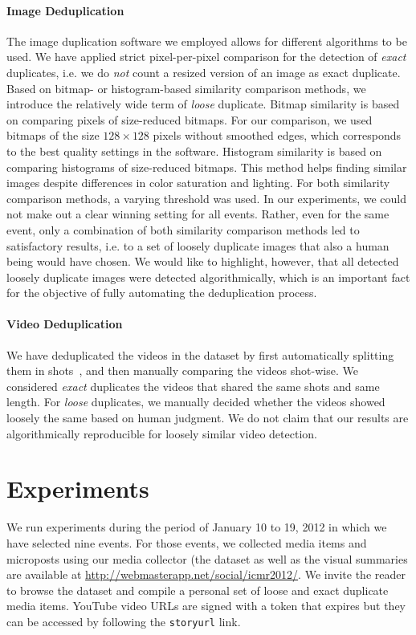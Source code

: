 \documentclass{acm_proc_article-sp}
\let\oldemph\emph
\renewcommand{\emph}[1]{\oldemph{\fontsize{9}{9}\selectfont #1}}
\newcommand{\inlinelistingsize}{\fontsize{8pt}{11pt}}
\let\oldurl\url
\renewcommand{\url}[1]{\inlinelistingsize\oldurl{#1}}
\begin{document}
\paragraph{Image Deduplication}
The image duplication software we employed allows for different algorithms to be used. We have applied strict pixel-per-pixel comparison for the detection of \emph{exact} duplicates, i.e. we do \emph{not} count a resized version of an image as exact duplicate. Based on bitmap- or histogram-based similarity comparison methods, we introduce the relatively wide term of \emph{loose} duplicate. Bitmap similarity is based on comparing pixels of size-reduced bitmaps.
For our comparison, we used bitmaps of the size $128 \times 128$ pixels without smoothed edges, which corresponds to the best quality settings in the software.
Histogram similarity is based on comparing histograms of size-reduced bitmaps. This method helps finding similar images despite differences in color saturation and lighting. For both similarity comparison methods, a varying threshold was used. In our experiments, we could not make out a clear winning setting for all events. Rather, even for the same event, only a combination of both similarity comparison methods led to satisfactory results, i.e. to a set of loosely duplicate images that also a human being would have chosen. We would like to highlight, however, that all detected loosely duplicate images were detected algorithmically, which is an important fact for the objective of fully automating the deduplication process.

\paragraph{Video Deduplication}
We have deduplicated the videos in the dataset by first automatically splitting them in shots~\cite{CrowdsourcingEvent}, and then manually comparing the videos shot-wise. We considered \emph{exact} duplicates the videos that shared the same shots and same length. For \emph{loose} duplicates, we manually decided whether the videos showed loosely the same based on human judgment. We do not claim that our results are algorithmically reproducible for loosely similar video detection.


\section{Experiments}                                                       \label{sec:experiments}
We run experiments during the period of January 10 to 19, 2012 in which we have selected nine events. For those events, we collected media items and microposts using our media collector (the dataset as well as the visual summaries are available at \url{http://webmasterapp.net/social/icmr2012/}. We invite the reader to browse the dataset and compile a personal set of loose and exact duplicate media items. YouTube video URLs are signed with a token that expires but they can be accessed by following the \texttt{storyurl} link.
\end{document}
